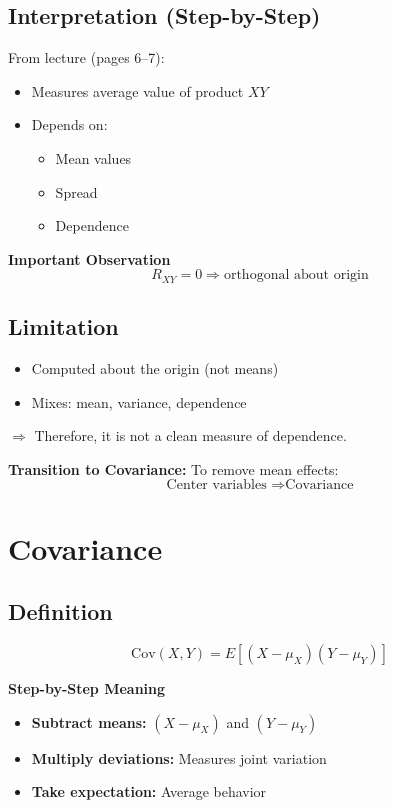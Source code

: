 \documentclass[12pt,a4paper]{article}
\begin{document}
\subsection{Interpretation (Step-by-Step)}
From lecture (pages 6–7):
\begin{itemize}
    \item Measures average value of product $XY$
    \item Depends on:
    \begin{itemize}
        \item Mean values
        \item Spread
        \item Dependence
    \end{itemize}
\end{itemize}

\textbf{Important Observation}
\[
R_{XY} = 0 \Rightarrow \text{orthogonal about origin}
\]

\subsection{Limitation}
\begin{itemize}
    \item Computed about the origin (not means)
    \item Mixes: mean, variance, dependence
\end{itemize}
$\Rightarrow$ Therefore, it is not a clean measure of dependence.

\textbf{Transition to Covariance:} To remove mean effects:
\[
\text{Center variables } \Rightarrow \text{Covariance}
\]

\section{Covariance}

\subsection{Definition}
\[
\text{Cov}(X,Y) = E[(X-\mu_X)(Y-\mu_Y)]
\]

\textbf{Step-by-Step Meaning}
\begin{itemize}
    \item \textbf{Subtract means:} $(X - \mu_X)$ and $(Y - \mu_Y)$
    \item \textbf{Multiply deviations:} Measures joint variation
    \item \textbf{Take expectation:} Average behavior
\end{itemize}
\end{document}
